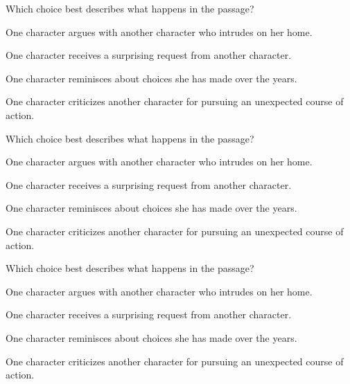 \documentclass{article}
\begin{document}
\begin{enumext}[label=\arabic*,labelwidth=20pt,labelsep=0pt,columns=2,columns-sep=30pt,save-ans=stylesat, wrap-label={\stylesat{#1}}]
 \item Which choice best describes what happens in the passage?
 
   \begin{keyans}
    \item* One character argues with another character who intrudes on her home.
    \item One character receives a surprising request from another character.
    \item One character reminisces about choices she has made over the years.
    \item One character criticizes another character for pursuing an unexpected course of action.
   \end{keyans}

 \item Which choice best describes what happens in the passage?
 
   \begin{keyans}
    \item One character argues with another character who intrudes on her home.
    \item One character receives a surprising request from another character.
    \item* One character reminisces about choices she has made over the years.
    \item One character criticizes another character for pursuing an unexpected course of action.
   \end{keyans}

 \item Which choice best describes what happens in the passage?
 
   \begin{keyans}
    \item One character argues with another character who intrudes on her home.
    \item* One character receives a surprising request from another character.
    \item One character reminisces about choices she has made over the years.
    \item One character criticizes another character for pursuing an unexpected course of action.
   \end{keyans}


\end{enumext}
\end{document}
